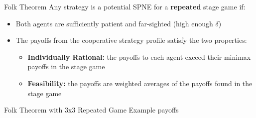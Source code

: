 \begin{frame}{Folk Theorem}
  Any strategy is a potential SPNE for a \textbf{repeated} stage game if: 
  \begin{itemize}
    \item Both agents are sufficiently patient and far-sighted (high enough $\delta$)
    \item The payoffs from the cooperative strategy profile satisfy the two properties: 
    \begin{itemize}
      \item \textbf{Individually Rational:} the payoffs to each agent exceed their minimax payoffs in the stage game 
      \item \textbf{Feasibility:} the payoffs are weighted averages of the payoffs found in the stage game
    \end{itemize}
  \end{itemize}
\end{frame}

\begin{frame}{Folk Theorem with 3x3 Repeated Game Example payoffs}
   
\end{frame}
